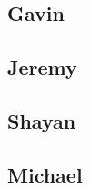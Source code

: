\documentclass{article}
\begin{document}
\subsection{Gavin}

\subsection{Jeremy}

\subsection{Shayan}

\subsection{Michael}


%
%
\end{document}
